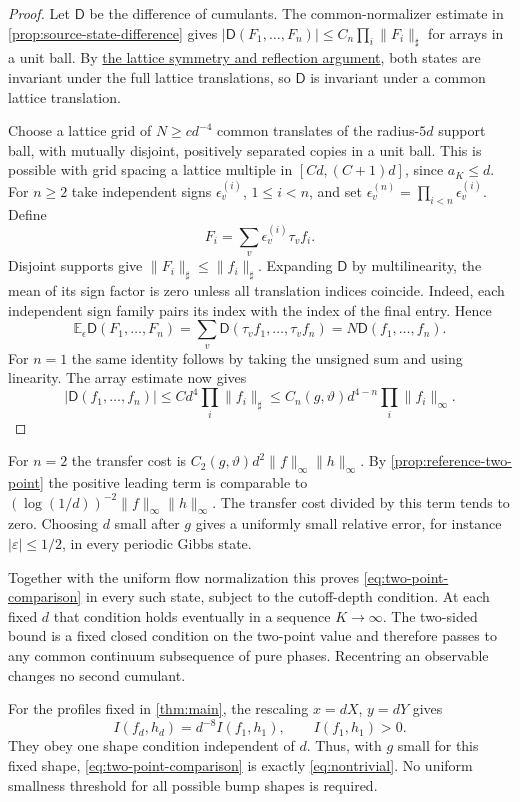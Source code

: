 \documentclass[11pt,letterpaper,reqno]{amsart}
\theoremstyle{definition}
\theoremstyle{remark}
\begin{document}
\begin{proof}
Let $\mathsf D$ be the difference of cumulants. The common-normalizer
estimate in \cref{prop:source-state-difference} gives
$|\mathsf D(F_1,\ldots,F_n)|\le C_n\prod_i\|F_i\|_\sharp$
for arrays in a unit ball. By \hyperref[hyp:gibbs-reflections]{the lattice symmetry and reflection argument}, both states
are invariant under the full lattice translations, so $\mathsf D$ is
invariant under a common lattice translation.

Choose a lattice grid of $N\ge cd^{-4}$ common translates of the
radius-$5d$ support ball, with mutually disjoint, positively separated
copies in a unit ball. This is possible with grid spacing a lattice
multiple in $[Cd,(C+1)d]$, since $a_K\le d$. For $n\ge2$ take
independent signs $\epsilon_v^{(i)}$, $1\le i<n$, and set
$\epsilon_v^{(n)}=\prod_{i<n}\epsilon_v^{(i)}$. Define
\[
 F_i=\sum_v\epsilon_v^{(i)}\tau_vf_i.
\]
Disjoint supports give $\|F_i\|_\sharp\le\|f_i\|_\sharp$.
Expanding $\mathsf D$ by multilinearity, the mean of its sign factor
is zero unless all translation indices coincide. Indeed, each
independent sign family pairs its index with the index of the final
entry. Hence
\[
 \mathbb E_\epsilon\mathsf D(F_1,\ldots,F_n)
          =\sum_v\mathsf D(\tau_vf_1,\ldots,\tau_vf_n)
          =N\mathsf D(f_1,\ldots,f_n).
\]
For $n=1$ the same identity follows by taking the unsigned sum and
using linearity. The array estimate now gives
\[
 |\mathsf D(f_1,\ldots,f_n)|
   \le Cd^4\prod_i\|f_i\|_\sharp
   \le C_n(g,\vartheta)d^{4-n}\prod_i\|f_i\|_\infty.
\]
\end{proof}

For $n=2$ the transfer cost is
$C_2(g,\vartheta)d^2\|f\|_\infty\|h\|_\infty$.
By \cref{prop:reference-two-point} the positive leading term is
comparable to $(\log(1/d))^{-2}\|f\|_\infty\|h\|_\infty$.
The transfer cost divided by this term tends to zero. Choosing $d$
small after $g$ gives a uniformly small relative error, for instance
$|\varepsilon|\le1/2$, in every periodic Gibbs state.

Together with the uniform flow normalization this proves
\eqref{eq:two-point-comparison} in every such state, subject to the
cutoff-depth condition. At each fixed $d$ that condition holds
eventually in a sequence $K\to\infty$. The two-sided bound is a fixed
closed condition on the two-point value and therefore passes to any
common continuum subsequence of pure phases. Recentring an observable
changes no second cumulant.

For the profiles fixed in \cref{thm:main}, the rescaling
$x=dX$, $y=dY$ gives
\[
 I(f_d,h_d)=d^{-8}I(f_1,h_1),\qquad I(f_1,h_1)>0.
\]
They obey one shape condition independent of $d$. Thus, with $g$ small
for this fixed shape, \eqref{eq:two-point-comparison} is exactly
\eqref{eq:nontrivial}. No uniform smallness threshold for all possible
bump shapes is required.
\end{document}
